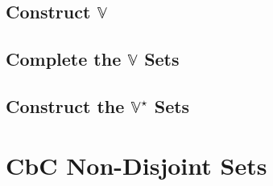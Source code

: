\documentclass[ClusteringConnectionsMAIN.tex]{subfiles}
\begin{document}
\section{Construct $\mathbb{V}$}


\newpage
\section{Complete the $\mathbb{V}$ Sets}


\newpage
\section{Construct the $\mathbb{V}^\star$ Sets}



%
%
\chapter{CbC Non-Disjoint Sets}

\end{document}
